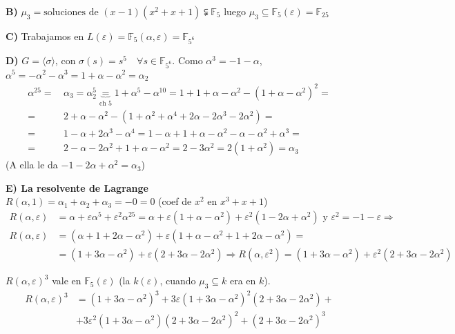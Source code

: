 \textbf{B)} $\mu_3 = \text{soluciones de } (x-1)(x^2+x+1) \subsetneqq \mathbb{F}_5$ luego $\mu_3 \subseteq \mathbb{F}_5(\varepsilon) = \mathbb{F}_{25}$

\textbf{C)} Trabajamos en $L(\varepsilon) = \mathbb{F}_5(\alpha, \varepsilon) = \mathbb{F}_{5^6}$

\textbf{D)} $G = \langle \sigma \rangle$, con $\sigma(s) = s^5 \quad \forall s \in \mathbb{F}_{5^6}$. Como $\alpha^3 = -1-\alpha$, $\alpha^5 = -\alpha^2 - \alpha^3 = \boxed{1+\alpha-\alpha^2 = \alpha_2}$ 
\begin{align*} \alpha^{25} = & \, \alpha_3 = \alpha_2^5 \underbrace{=}_{\text{ch 5}} 1 + \alpha^5 - \alpha^{10} = 1 + 1 + \alpha - \alpha^2 - (1 + \alpha - \alpha^2)^2 =  \\
= & \, 2 + \alpha - \alpha^2 - (1 + \alpha^2 + \alpha^4 + 2\alpha - 2\alpha^3 - 2\alpha^2) =  \\
= & \, 1 - \alpha + 2\alpha^3 - \alpha^4 = 1 - \alpha + 1 + \alpha - \alpha^2 - \alpha - \alpha^2 + \alpha^3 = \\
= & \, 2 - \alpha - 2\alpha^2 + 1 + \alpha - \alpha^2 = 2 - 3\alpha^2 = \boxed{2(1+\alpha^2) = \alpha_3} \end{align*}
\hspace*{6cm} (A ella le da \underline{$-1-2\alpha+\alpha^2 = \alpha_3$}) 

\textbf{E) La resolvente de Lagrange} \\
$R(\alpha, 1) = \alpha_1 + \alpha_2 + \alpha_3 = -0 = 0$ (coef de $x^2$ en $x^3+x+1$)
\begin{align*} R(\alpha, \varepsilon) & = \alpha + \varepsilon \alpha^5 + \varepsilon^2 \alpha^{25} = \alpha + \varepsilon(1+\alpha-\alpha^2) + \varepsilon^2(1-2\alpha+\alpha^2) \text{ y } \varepsilon^2 = -1-\varepsilon \Rightarrow \\
R(\alpha, \varepsilon) & = (\alpha + 1 + 2\alpha - \alpha^2) + \varepsilon(1 + \alpha - \alpha^2 + 1 + 2\alpha - \alpha^2) = \\
& = (1 + 3\alpha - \alpha^2) + \varepsilon(2 + 3\alpha - 2\alpha^2) \Rightarrow R(\alpha, \varepsilon^2) =  (1 + 3\alpha - \alpha^2) + \varepsilon^2(2 + 3\alpha - 2\alpha^2)
\end{align*}

\noindent $R(\alpha, \varepsilon)^3$ vale en $\mathbb{F}_5(\varepsilon)$ (la $k(\varepsilon)$, cuando $\mu_3 \subseteq k $ era en $k$). 
\begin{align*} R(\alpha, \varepsilon)^3 & = (1+3\alpha-\alpha^2)^3 + 3 \varepsilon (1+3\alpha-\alpha^2)^2 (2+3\alpha-2\alpha^2) + \\ & +  3 \varepsilon^2 (1+3\alpha-\alpha^2) (2+3\alpha-2\alpha^2)^2+(2+3\alpha-2\alpha^2)^3 \end{align*}

